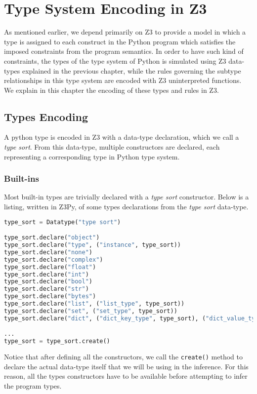 
\chapter{Type System Encoding in Z3}\label{chapter:ts}
As mentioned earlier, we depend primarily on Z3 to provide a model in which a type is assigned to each construct in the Python program which satisfies the imposed constraints from the program semantics. In order to have such kind of constraints, the types of the type system of Python is simulated using Z3 data-types explained in the previous chapter, while the rules governing the subtype relationships in this type system are encoded with Z3 uninterpreted functions. We explain in this chapter the encoding of these types and rules in Z3.
\section{Types Encoding}
A python type is encoded in Z3 with a data-type declaration, which we call a \textit{type sort}. From this data-type, multiple constructors are declared, each representing a corresponding type in Python type system.\\

\subsection{Built-ins}
Most built-in types are trivially declared with a \textit{type sort} constructor. Below is a listing, written in Z3Py, of some types declarations from the \textit{type sort} data-type.

\begin{lstlisting}[language=python]
type_sort = Datatype("type sort")

type_sort.declare("object")
type_sort.declare("type", ("instance", type_sort))
type_sort.declare("none")
type_sort.declare("complex")
type_sort.declare("float")
type_sort.declare("int")
type_sort.declare("bool")
type_sort.declare("str")
type_sort.declare("bytes")
type_sort.declare("list", ("list_type", type_sort))
type_sort.declare("set", ("set_type", type_sort))
type_sort.declare("dict", ("dict_key_type", type_sort), ("dict_value_type", type_sort))

...
type_sort = type_sort.create()
\end{lstlisting}

Notice that after defining all the constructors, we call the \lstinline|create()| method to declare the actual data-type itself that we will be using in the inference. For this reason, all the types constructors have to be available before attempting to infer the program types.

